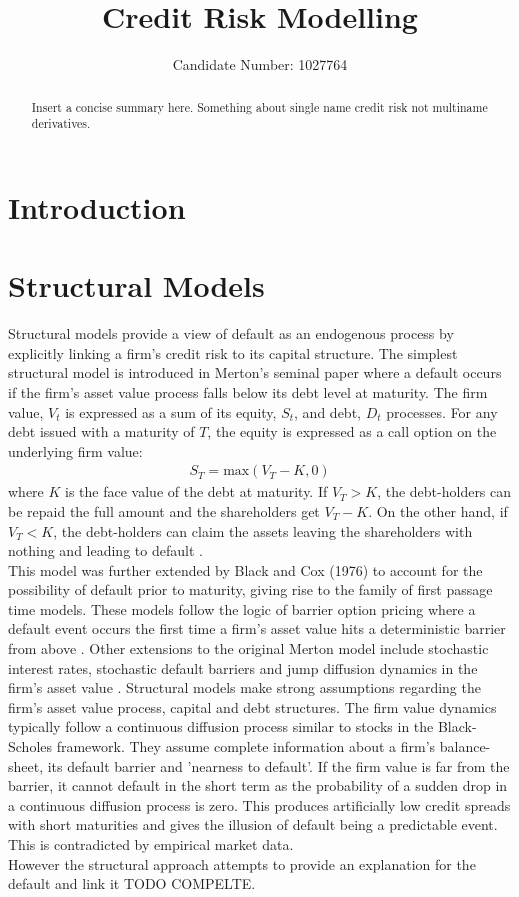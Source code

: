 \documentclass[11t,a4paper]{article}
\title{Credit Risk Modelling}
\author{Candidate Number: 1027764}
\begin{document}
\maketitle

\thispagestyle{empty}

\newpage
\tableofcontents
\thispagestyle{empty}
\newpage

\begin{abstract}
  Insert a concise summary here. Something about single name credit risk not multiname derivatives.
\end{abstract}
\newpage
\setcounter{page}{1}

\section{Introduction}
\section{Structural Models}
Structural models provide a view of default as an endogenous process by explicitly linking a firm's credit risk to its capital structure. The simplest structural model is introduced in Merton's seminal paper where a default occurs if the firm's asset value process falls below its debt level at maturity. The firm value, $V_t$ is expressed as a sum of its equity, $S_t$, and debt, $D_t$ processes. For any debt issued with a maturity of $T$, the equity is expressed as a call option on the underlying firm value:
\begin{align}
    S_T = \text{max}(V_T - K, 0)
\end{align}
where $K$ is the face value of the debt at maturity. If $V_T > K$, the debt-holders can be repaid the full amount and the shareholders get $V_T-K$. On the other hand, if $V_T<K$, the debt-holders can claim the assets leaving the shareholders with nothing and leading to default \cite{merton}. \\   
 This model was further extended by Black and Cox (1976) to account for the possibility of default prior to maturity, giving rise to the family of first passage time models. These models follow the logic of barrier option pricing where a default event occurs the first time a firm's asset value hits a deterministic barrier from above \cite{Brigobook}. Other extensions to the original Merton model include stochastic interest rates, stochastic default barriers and jump diffusion dynamics in the firm's asset value \cite{levycg}.
 Structural models make strong assumptions regarding the firm's asset value process, capital and debt structures. The firm value dynamics typically follow a continuous diffusion process similar to stocks in the Black-Scholes framework. They assume complete information about a firm's balance-sheet, its default barrier and 'nearness to default'. If the firm value is far from the barrier, it cannot default in the short term as the probability of a sudden drop in a continuous diffusion process is zero. This produces artificially low credit spreads with short maturities and gives the illusion of default being a predictable event. This is contradicted by empirical market data.\\
 However the structural approach attempts to provide an explanation for the default and link it TODO COMPELTE. 
\end{document}
